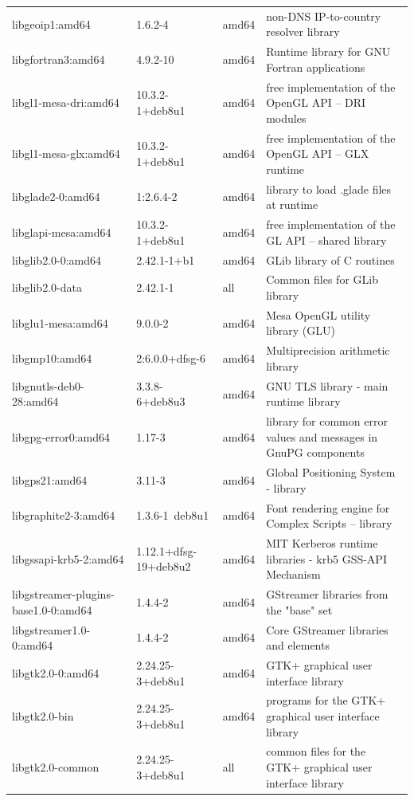 \documentclass[a4paper,10pt]{article}
\begin{document}
\begin{appendices}
{\begin{longtable}{p{3.25cm}@{\hspace{0.25cm}}p{4cm}@{\hspace{0.25cm}}l@{\hspace{0.25cm}}p{7cm}}
libgeoip1:amd64	&	1.6.2-4	&	amd64	&	non-DNS IP-to-country resolver library	\\
libgfortran3:amd64	&	4.9.2-10	&	amd64	&	Runtime library for GNU Fortran applications	\\
libgl1-mesa-dri:amd64	&	10.3.2-1+deb8u1	&	amd64	&	free implementation of the OpenGL API -- DRI modules	\\
libgl1-mesa-glx:amd64	&	10.3.2-1+deb8u1	&	amd64	&	free implementation of the OpenGL API -- GLX runtime	\\
libglade2-0:amd64	&	1:2.6.4-2	&	amd64	&	library to load .glade files at runtime	\\
libglapi-mesa:amd64	&	10.3.2-1+deb8u1	&	amd64	&	free implementation of the GL API -- shared library	\\
libglib2.0-0:amd64	&	2.42.1-1+b1	&	amd64	&	GLib library of C routines	\\
libglib2.0-data	&	2.42.1-1	&	all	&	Common files for GLib library	\\
libglu1-mesa:amd64	&	9.0.0-2	&	amd64	&	Mesa OpenGL utility library (GLU)	\\
libgmp10:amd64	&	2:6.0.0+dfsg-6	&	amd64	&	Multiprecision arithmetic library	\\
libgnutls-deb0-28:amd64	&	3.3.8-6+deb8u3	&	amd64	&	GNU TLS library - main runtime library	\\
libgpg-error0:amd64	&	1.17-3	&	amd64	&	library for common error values and messages in GnuPG components	\\
libgps21:amd64	&	3.11-3	&	amd64	&	Global Positioning System - library	\\
libgraphite2-3:amd64	&	1.3.6-1~deb8u1	&	amd64	&	Font rendering engine for Complex Scripts -- library	\\
libgssapi-krb5-2:amd64	&	1.12.1+dfsg-19+deb8u2	&	amd64	&	MIT Kerberos runtime libraries - krb5 GSS-API Mechanism	\\
libgstreamer-plugins-base1.0-0:amd64	&	1.4.4-2	&	amd64	&	GStreamer libraries from the "base" set	\\
libgstreamer1.0-0:amd64	&	1.4.4-2	&	amd64	&	Core GStreamer libraries and elements	\\
libgtk2.0-0:amd64	&	2.24.25-3+deb8u1	&	amd64	&	GTK+ graphical user interface library	\\
libgtk2.0-bin	&	2.24.25-3+deb8u1	&	amd64	&	programs for the GTK+ graphical user interface library	\\
libgtk2.0-common	&	2.24.25-3+deb8u1	&	all	&	common files for the GTK+ graphical user interface library	\\

\end{longtable}}
\end{appendices}
\end{document}

